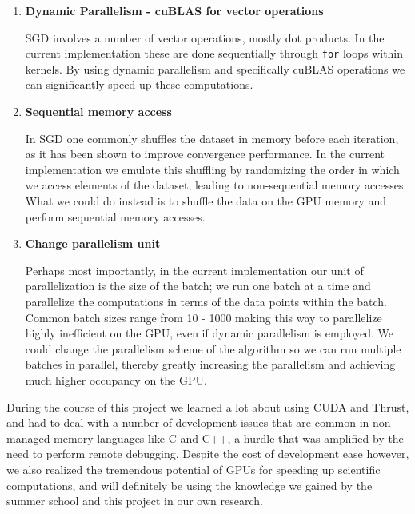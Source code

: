 \documentclass[11pt,a4paper]{article}
\begin{document}
\begin{enumerate}
	\item \textbf{Dynamic Parallelism - cuBLAS for vector operations}
	
	SGD involves a number of vector operations, mostly dot products.
	In the current implementation these are done sequentially through \texttt{for} loops within kernels.
	By using dynamic parallelism and specifically cuBLAS operations
	we can significantly speed up these computations.
	
	
	\item \textbf{Sequential memory access}
	
	In SGD one commonly shuffles the dataset in memory before each iteration, as it has been shown to improve
	convergence performance. In the current implementation we emulate this shuffling by randomizing the
	order in which we access elements of the dataset, leading to non-sequential memory 
	accesses. What we could do instead is to shuffle the data on the GPU memory and perform 
	sequential memory accesses.
	
	\item \textbf{Change parallelism unit}
	
	Perhaps most importantly, in the current implementation our unit of parallelization is the size of the batch; we run one batch 
	at a time and parallelize
	the computations in terms of the data points within the batch. Common batch sizes range from 10 - 1000
	making this way to parallelize highly inefficient on the GPU, even if dynamic parallelism is employed.
	We could change the parallelism scheme of the algorithm so we can run multiple
	batches in parallel, thereby greatly increasing the parallelism and achieving much 
	higher occupancy on the GPU.
\end{enumerate}

During the course of this project we learned a lot about using CUDA and Thrust, and had
to deal with a number of development issues that are common in non-managed memory 
languages like C and C++, a hurdle that was amplified by the need to perform remote
debugging. Despite the cost of development ease however, we also realized the tremendous potential of GPUs for speeding up scientific computations, and will definitely be
using the knowledge we gained by the summer school and this project in our own research.



\end{document}
